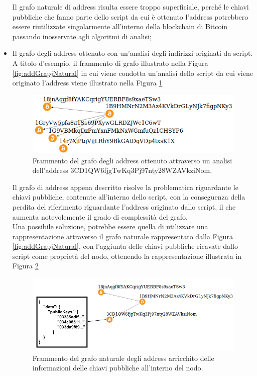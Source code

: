 \begin{itemize}
   Il grafo naturale di address risulta essere troppo superficiale, perché le chiavi pubbliche che fanno parte dello script da cui è ottenuto l'address  potrebbero essere riutilizzate singolarmente all'interno della blockchain di Bitcoin passando inosservate agli algoritmi di analisi;
   \item Il grafo degli address ottenuto con un'analisi degli indirizzi originati da script. A titolo d'esempio, il frammento di grafo illustrato nella Figura \ref{fig:addGrapjNatural} in cui viene condotta un'analisi dello script da cui viene originato l'address  viene illustrato nella Figura \ref{fig:addGraphAnalisis}
   \begin{figure}[H]
   \centering
   \includegraphics[scale=0.35]{images/exampleWithGraph/decode-address-graph-scam.png}
   \caption{Frammento del grafo degli address ottenuto attraverso un analisi dell'address 3CD1\-QW6fjg\-TwKq3Pj\-97nty28W\-ZAVkz\-iNom.\label{fig:addGraphAnalisis}}
   \end{figure}
   Il grafo di address appena descritto risolve la problematica riguardante le chiavi pubbliche, contenute all'interno dello script, con la conseguenza della perdita del riferimento riguardante l'address originato dallo script, il che aumenta notevolemente il grado di complessità del grafo.\\
   Una possibile soluzione, potrebbe essere quella di utilizzare una rappresentazione attraverso il grafo naturale rappresentato dalla Figura \ref{fig:addGrapjNatural}, con l'aggiunta delle chiavi pubbliche ricavate dallo script come proprietà del nodo, ottenendo la rappresentazione illustrata in Figura \ref{fig:addGrapjNaturalPlus}
   \begin{figure}[H]
   \centering
   \includegraphics[scale=1.5]{images/exampleWithGraph/naturalAddressGrahScamTx_correcter.png}
   \caption{Frammento del grafo naturale degli address arricchito delle informazioni delle chiavi pubbliche all'interno del nodo.\label{fig:addGrapjNaturalPlus}}
   \end{figure}
 \end{itemize}

